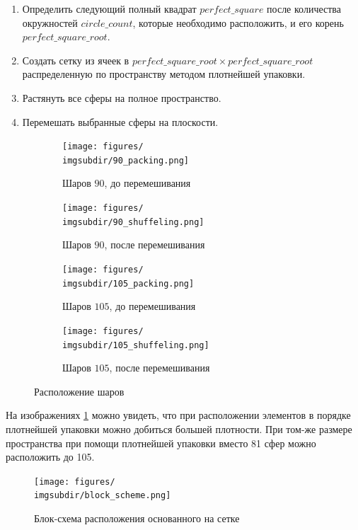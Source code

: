 \begin{enumerate}
\begin{enumerate}[label=\arabic*)]
        \item 
        Определить следующий полный квадрат $perfect\_square$ после количества окружностей $circle\_count$, которые необходимо расположить, и его корень \newline $perfect\_square\_root$.
        \item 
        Создать сетку из ячеек в $perfect\_square\_root \times perfect\_square\_root$ распределенную по пространству методом плотнейшей упаковки.
        \item
        Растянуть все сферы на полное пространство.
        \item
        Перемешать выбранные сферы на плоскости.
    \end{enumerate}
    
    \newcommand{\imgsize}{6cm}
    \newcommand{\imgsubdir}{tight_packing}
    \begin{figure}[h!]
        \begin{subfigure}{0.49\textwidth}
            \centering
            \texttt{[image: figures/\\imgsubdir/90\_packing.png]}
            \caption{Шаров $90$, до перемешивания}
        \end{subfigure}
        \begin{subfigure}{0.49\textwidth}
            \centering
            \texttt{[image: figures/\\imgsubdir/90\_shuffeling.png]}
            \caption{Шаров $90$, после перемешивания}
        \end{subfigure}
        \begin{subfigure}{0.49\textwidth}
            \centering
            \texttt{[image: figures/\\imgsubdir/105\_packing.png]}
            \caption{Шаров $105$, до перемешивания}
        \end{subfigure}
        \begin{subfigure}{0.49\textwidth}
            \centering
            \texttt{[image: figures/\\imgsubdir/105\_shuffeling.png]}
            \caption{Шаров $105$, после перемешивания}
        \end{subfigure}
        \caption{Расположение шаров}
        \label{fig:tight_packing}
    \end{figure}
    На изображениях \ref{fig:tight_packing} можно увидеть, что при расположении элементов в порядке плотнейшей упаковки можно добиться большей плотности. При том-же размере пространства при помощи плотнейшей упаковки вместо 81 сфер можно расположить до 105. 
    \begin{figure}[h!]
        \centering
        \texttt{[image: figures/\\imgsubdir/block\_scheme.png]}
        \caption{Блок-схема расположения основанного на сетке}
        \label{fig:my_label}
    \end{figure}
\end{enumerate}

